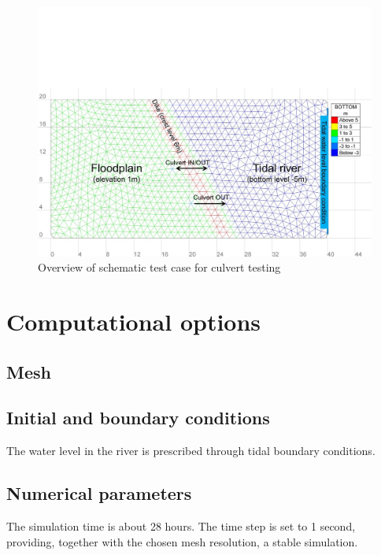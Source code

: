 \begin{figure}[h]
\begin{center}
	\includegraphics[scale=0.5]{figure1.png}
\end{center}
\caption{Overview of schematic test case for culvert testing}
\label{fig:culvert_figure1}
\end{figure}

\section{Computational options}
%
\subsection{Mesh}

\subsection{Initial and boundary conditions}
The water level in the river is prescribed through tidal boundary conditions. 
%
\subsection{Numerical parameters}


The simulation time is about 28 hours.
The time step is set to 1 second, providing, together with the chosen mesh resolution, a stable simulation.


